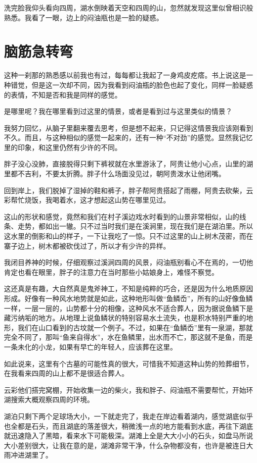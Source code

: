洗完脸我仰头看向四周，湖水倒映着天空和四周的山，忽然就发现这里似曾相识般熟悉。我看了一眼，边上的闷油瓶也是一脸的疑惑。

\chapter{脑筋急转弯}

这种一刹那的熟悉感以前我也有过，每每都让我起了一身鸡皮疙瘩。书上说这是一种错觉，但是这一次却不同，因为我看到闷油瓶的脸色也起了变化，同样一脸疑惑的表情，不知是否和我是同样的感觉。

是哪里呢？我在哪里看到过这里的情景，或者是看到过与这里类似的情景？

我努力回忆，从脑子里翻来覆去思考，但是想不起来，只记得这情景我应该刚看到不久。而且，与这种相似的感觉一起来的，还有一种“不对劲”的感觉。显然我记忆里的印象，和这里仍然有少许的不同。

胖子没心没肺，直接脱得只剩下裤衩就在水里游泳了，阿贵让他小心点，山里的湖里都不吉利，不要太折腾。胖子什么场面没见过，朝阿贵泼水让他闭嘴。

回到岸上，我们脱掉了湿掉的鞋和裤子，胖子帮阿贵搭起了雨棚，阿贵去砍柴，云彩帮忙烧饭，我喝着水，这才想起这山势在哪里见过。

这山的形状和感觉，竟然和我们在村子溪边戏水时看到的山景非常相似，山的线条、走势，都如出一辙。只不过当时我们是在溪涧里，现在我们是在湖泊里。所以这水里的倒影和山的样子，一下让我吃了一惊。只不过这里的山上树木茂密，而在寨子边上，树木都被砍伐过了，所以才有少许的异样。

我闭目养神的时候，仔细观察过溪涧四周的风景，闷油瓶别看心不在焉的，一切他肯定也看在眼里，胖子的注意力在当时那些小姑娘身上，难怪不察觉。

这还真是有趣，大自然真是鬼斧神工，不知是纯粹的巧合，还是因为什么地质原因形成。好像有一种风水地势就是如此，这种地形叫做“鱼鳞岙”，所有的山好像鱼鳞一样，一层一层的，山势都十分的相像，这种风水不适合葬人，因为据说鱼鳞下是藏污纳垢的地方。从地理上说鱼鳞状的特别容易水土流失，也是积水特别严重的地形，我们在山口看到的古坟就一个例子。不过，如果在“鱼鳞岙”里有一泉湖，那就完全不同了，那叫“鱼来自得水”，水在鱼鳞里，出水而不亡，那这就不是鱼，而是一条未化的小龙，如果有早亡的年轻人，应该葬在这里。

如此说来，这里有个古墓的可能性真的很大，可惜我不知道这种山势的殓葬细节，在我看来四周的山上都不是很适合葬人。

云彩他们搭完窝棚，开始收集一边的柴火，我和胖子、闷油瓶不需要帮忙，开始环湖搜索大概观察四周的环境。

湖泊只剩下两个足球场大小，一下就走完了，我走在岸边看着湖内，感觉湖底似乎也全都是石头，而且湖底的落差很大，稍微浅一点的地方能看到水底，再往下湖底就迅速隐入了黑暗，看来水下可能极深。湖滩上全是大大小小的石头，如盘马所说大小差别很大，让我在意的是，湖滩非常干净，什么杂物都没有，也许是被连日大雨冲进湖里了。

